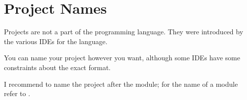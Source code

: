 \section{Project Names}\label{sec:Projects}
Projects are not a part of the \Java programming language. They were introduced by the various IDEs for the language.

You can name your project however you want, although some IDEs have some constraints about the exact format.

I recommend to name the project after the module; for the name of a module refer to .

